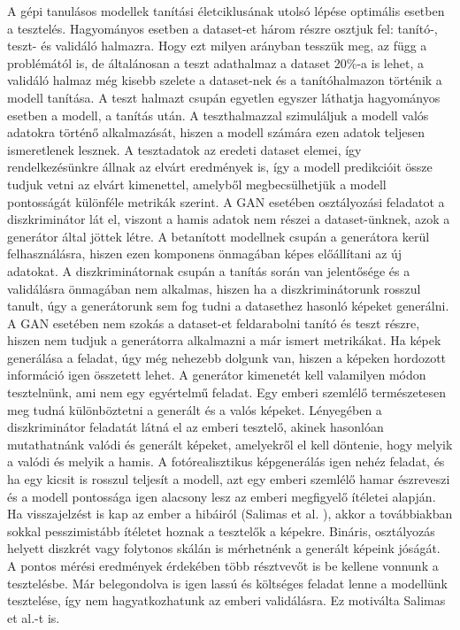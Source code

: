 A gépi tanulásos modellek tanítási életciklusának utolsó lépése optimális esetben a tesztelés. Hagyományos esetben a dataset-et három részre osztjuk fel: tanító-, teszt- és validáló halmazra. Hogy ezt milyen arányban tesszük meg, az függ a problémától is, de általánosan a teszt adathalmaz a dataset 20\%-a is lehet, a validáló halmaz még kisebb szelete a dataset-nek és a tanítóhalmazon történik a modell tanítása.
A teszt halmazt csupán egyetlen egyszer láthatja hagyományos esetben a modell, a tanítás után.
A teszthalmazzal szimuláljuk a modell valós adatokra történő alkalmazását, hiszen a modell számára ezen adatok teljesen ismeretlenek lesznek. A tesztadatok az eredeti dataset elemei, így rendelkezésünkre állnak az elvárt eredmények is, így a modell predikcióit össze tudjuk vetni az elvárt kimenettel, amelyből megbecsülhetjük a modell pontosságát különféle metrikák szerint.
A GAN esetében osztályozási feladatot a diszkriminátor lát el, viszont a hamis adatok nem részei a dataset-ünknek, azok a generátor által jöttek létre. A betanított modellnek csupán a generátora kerül felhasználásra, hiszen ezen komponens önmagában képes előállítani az új adatokat. A diszkriminátornak csupán a tanítás során van jelentősége és a validálásra önmagában nem alkalmas, hiszen ha a diszkriminátorunk rosszul tanult, úgy a generátorunk sem fog tudni a datasethez hasonló képeket generálni.
A GAN esetében nem szokás a dataset-et feldarabolni tanító és teszt részre, hiszen nem tudjuk a generátorra alkalmazni a már ismert metrikákat.
Ha képek generálása a feladat, úgy még nehezebb dolgunk van, hiszen a képeken hordozott információ igen összetett lehet.
A generátor kimenetét kell valamilyen módon tesztelnünk, ami nem egy egyértelmű feladat.
Egy emberi szemlélő természetesen meg tudná különböztetni a generált és a valós képeket. Lényegében a diszkriminátor feladatát látná el az emberi tesztelő, akinek hasonlóan mutathatnánk valódi és generált képeket, amelyekről el kell döntenie, hogy melyik a valódi és melyik a hamis. A fotórealisztikus képgenerálás igen nehéz feladat, és ha egy kicsit is rosszul teljesít a modell, azt egy emberi szemlélő hamar észreveszi és a modell pontossága igen alacsony lesz az emberi megfigyelő ítéletei alapján. Ha visszajelzést is kap az ember a hibáiról (Salimas et al. \cite{salimans2016improved}), akkor a továbbiakban sokkal pesszimistább ítéletet hoznak a tesztelők a képekre. Bináris, osztályozás helyett diszkrét vagy folytonos skálán is mérhetnénk a generált képeink jóságát. A pontos mérési eredmények érdekében több résztvevőt is be kellene vonnunk a tesztelésbe. Már belegondolva is igen lassú és költséges feladat lenne a modellünk tesztelése, így nem hagyatkozhatunk az emberi validálásra. Ez motiválta Salimas et al.-t is.

